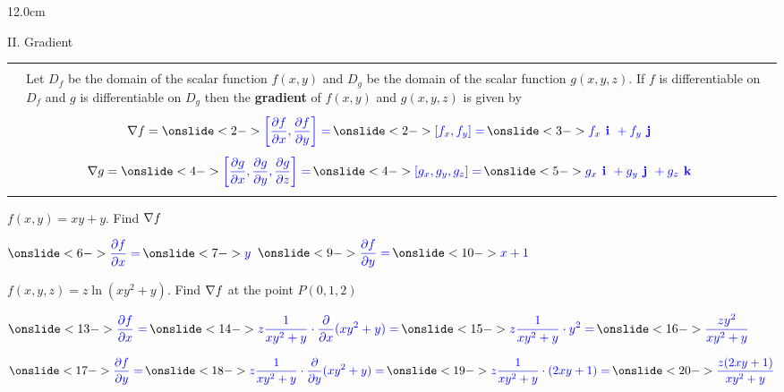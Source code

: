 \begin{frame}
\begin{columns}\begin{column}{12.0cm}

{II. Gradient}
\scriptsize
\begin{center}
{\setlength{\extrarowheight}{-0.2cm}
\begin{tabular}{|p{0.4cm}p{10.6cm}|}
	\hline
	\hline
	&\\
	\DEF & Let $D_f$ be the domain of the scalar function $f(x,y)$ and $D_g$ be the domain of the scalar function $g(x,y,z)$.  If $f$ is differentiable on $D_f$ and $g$ is differentiable on $D_g$ then the {\bf gradient} of $f(x,y)$ and $g(x,y,z)$ is given by \\
	&\\
	\multicolumn{2}{|c|}{$\D{\nabla f = 
	\ON<2->{\B{\left[\PFPX,\PFPY\right] =\,}} 
	\ON<2->{\B{\left[f_x,f_y\right] =\,}} 
	\ON<3->{\B{f_x \VI + f_y \VJ}}}$} \\
	& \\
	\multicolumn{2}{|c|}{$\D{\nabla g = 
	\ON<4->{\B{\left[\PGPX,\PGPY,\PGPZ\right] =\,}} 
	\ON<4->{\B{\left[g_x,g_y,g_z\right] =\,}} 
	\ON<5->{\B{g_x \VI + g_y \VJ + g_z \VK}}}$} \\
	& \\
	\hline
	\hline
\end{tabular}}
\end{center}
\EX $f(x,y) = xy + y$. \quad Find ${\nabla f}$

\vspace{0.2cm}

$\D{\ON<6->{\B{\PFPX =\,}} 
\ON<7->{\B{y}}}$ \quad 
{} \quad $\D{
\ON<9->{\B{\PFPY =\,}} 
\ON<10->{\B{x + 1}}}$ \quad 
{} \quad 
{}

\vspace{0.2cm}

\EX $f(x,y,z) = z\ln(xy^2 + y)$. \quad Find ${\nabla f}$ at the point $P(0,1,2)$

\vspace{0.1cm}

$\D{\ON<13->{\B{\PFPX =\,}} 
\ON<14->{\B{z\frac{1}{xy^2 + y}\cdot \PPX(xy^2 + y) = \,}} 
\ON<15->{\B{z\frac{1}{xy^2 + y}\cdot y^2 =\,}} 
\ON<16->{\B{\frac{zy^2}{xy^2 + y}}}}$

\vspace{0.1cm}

$\D{\ON<17->{\B{\PFPY = \,}}
\ON<18->{\B{z\frac{1}{xy^2 + y}\cdot \PPY(xy^2 + y) = \,}}
\ON<19->{\B{z\frac{1}{xy^2 + y}\cdot (2xy+1) =\,}}
\ON<20->{\B{\frac{z(2xy+1)}{xy^2 + y}}}}$


\end{column}
\end{columns}
\end{frame}
